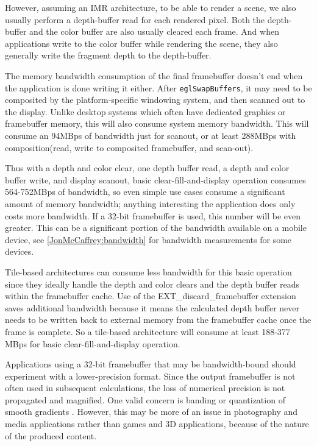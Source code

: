  

However, assuming an IMR architecture, to be able to render a scene, we also
usually perform a depth-buffer read for each rendered pixel.  Both the
depth-buffer and the color buffer are also usually cleared each frame.  And
when applications write to the color buffer while rendering the scene, they
also generally write the fragment depth to the depth-buffer.

The memory bandwidth consumption of the final framebuffer doesn't end when the
application is done writing it either.  After \texttt{eglSwapBuffers}, it may
need to be composited by the platform-specific windowing system, and then
scanned out to the display.  Unlike desktop systems which often have
dedicated graphics or framebuffer memory, this will also consume system memory
bandwidth.  This will consume an 94MBps of bandwidth just for
scanout, or at least 288MBps with composition(read, write to
composited framebuffer, and scan-out).


 Thus with a depth and color clear, one depth buffer read, a depth and color
 buffer write, and display scanout, basic clear-fill-and-display operation
 consumes 564-752MBps of bandwidth, so even simple use cases consume a
 significant amount of memory bandwidth; anything interesting the application
 does only costs more bandwidth. If a 32-bit framebuffer is used, this number
 will be even greater.  This can be a significant portion of the bandwidth available on a mobile device, see \ref{JonMcCaffrey:bandwidth} for bandwidth
 measurements for some devices.

 Tile-based architectures can consume less bandwidth for this basic operation
 since they ideally handle the depth and color clears and the depth buffer
 reads within the framebuffer cache.  Use of the
 EXT\_discard\_framebuffer\cite{EXT_discard_framebuffer} extension saves
 additional bandwidth because it means the calculated depth buffer never needs
 to be written back to external memory from the framebuffer cache once the
 frame is complete. So a tile-based architecture will consume at least 188-377
 MBps for basic clear-fill-and-display operation.


Applications using a 32-bit framebuffer that may be bandwidth-bound should
experiment with a lower-precision format.  Since the output framebuffer is not
often used in subsequent calculations, the loss of numerical precision is not
propagated and magnified.  One valid concern is banding or quantization of
smooth gradients \cite{Guy10}.  However, this may be more of an issue in
photography and media applications rather than games and 3D applications,
because of the nature of the produced content.

